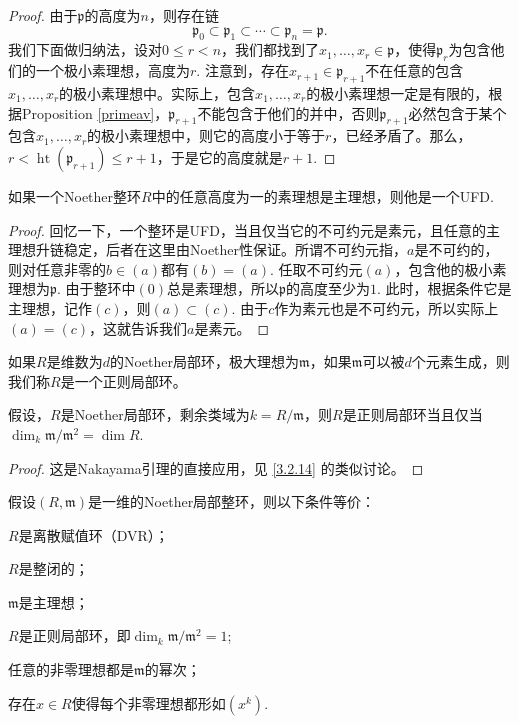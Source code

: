 \begin{proof}
由于$\mathfrak p$的高度为$n$，则存在链 
\[
	\mathfrak p_0\subset \mathfrak p_1\subset \cdots \subset \mathfrak p_n=\mathfrak p.
\]
我们下面做归纳法，设对$0\leq r<n$，我们都找到了$x_1,\dots,x_r\in \mathfrak p$，使得$\mathfrak p_r$为包含他们的一个极小素理想，高度为$r$. 注意到，存在$x_{r+1}\in \mathfrak p_{r+1}$不在任意的包含$x_1,\dots,x_r$的极小素理想中。实际上，包含$x_1,\dots,x_r$的极小素理想一定是有限的，根据Proposition \ref{primeav}，$\mathfrak p_{r+1}$不能包含于他们的并中，否则$\mathfrak p_{r+1}$必然包含于某个包含$x_1,\dots,x_r$的极小素理想中，则它的高度小于等于$r$，已经矛盾了。那么，$r<\operatorname{ht}(\mathfrak p_{r+1})\leq r+1$，于是它的高度就是$r+1$.
\end{proof}

\begin{pro}
	如果一个Noether整环$R$中的任意高度为一的素理想是主理想，则他是一个UFD.
\end{pro}

\begin{proof}
回忆一下，一个整环是UFD，当且仅当它的不可约元是素元，且任意的主理想升链稳定，后者在这里由Noether性保证。所谓不可约元指，$a$是不可约的，则对任意非零的$b\in(a)$都有$(b)=(a)$. 任取不可约元$(a)$，包含他的极小素理想为$\mathfrak p$. 由于整环中$(0)$总是素理想，所以$\mathfrak p$的高度至少为$1$. 此时，根据条件它是主理想，记作$(c)$，则$(a)\subset (c)$. 由于$c$作为素元也是不可约元，所以实际上$(a)= (c)$，这就告诉我们$a$是素元。
\end{proof}

\para[正则局部环] 如果$R$是维数为$d$的Noether局部环，极大理想为$\mathfrak m$，如果$\mathfrak m$可以被$d$个元素生成，则我们称$R$是一个正则局部环。

\begin{pro}
假设，$R$是Noether局部环，剩余类域为$k=R/\mathfrak m$，则$R$是正则局部环当且仅当$\dim_k \mathfrak m/\mathfrak m^2=\dim R$.
\end{pro}

\begin{proof}
这是Nakayama引理的直接应用，见 \ref{3.2.14} 的类似讨论。
\end{proof}

\begin{theo}
假设$(R,\mathfrak m)$是一维的Noether局部整环，则以下条件等价：
\begin{compactenum}
	\item $R$是离散赋值环（DVR）；
	\item $R$是整闭的；
	\item $\mathfrak m$是主理想；
	\item $R$是正则局部环，即$\dim_k \mathfrak m/\mathfrak m^2=1$;
	\item 任意的非零理想都是$\mathfrak m$的幂次；
	\item 存在$x\in R$使得每个非零理想都形如$(x^k)$.
\end{compactenum}
\end{theo}

